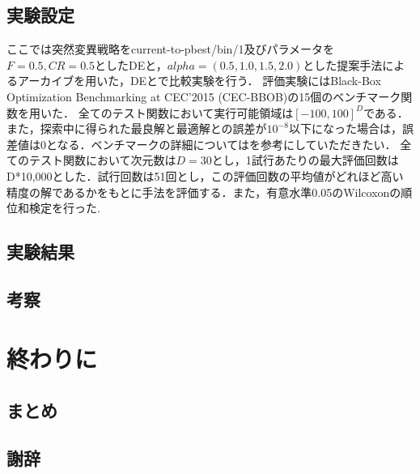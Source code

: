 \documentclass[a4paper,11pt,oneside,openany]{jsbook}
\begin{document}
\section{実験設定}
ここでは突然変異戦略をcurrent-to-pbest/bin/1及びパラメータを$F=0.5, CR=0.5$としたDEと，$alpha = (0.5, 1.0, 1.5, 2.0)$とした提案手法によるアーカイブを用いた，DEとで比較実験を行う．
評価実験にはBlack-Box Optimization Benchmarking at CEC'2015 (CEC-BBOB)の15個のベンチマーク関数を用いた．
全てのテスト関数において実行可能領域は$[-100,100]^D$である．また，探索中に得られた最良解と最適解との誤差が$10^{-8}$以下になった場合は，誤差値は0となる．ベンチマークの詳細については\cite{CEC2015}を参考にしていただきたい．
全てのテスト関数において次元数は$D=30$とし，1試行あたりの最大評価回数はD*10,000とした．試行回数は51回とし，この評価回数の平均値がどれほど高い精度の解であるかをもとに手法を評価する．また，有意水準0.05のWilcoxonの順位和検定を行った.



\section{実験結果}

\section{考察}

\chapter{終わりに}
\section{まとめ}
\section{謝辞}
\end{document}
